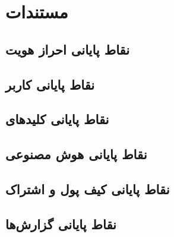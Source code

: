 \chapter{مستندات }
\label{app:api}

\section{نقاط پایانی احراز هویت}
\section{نقاط پایانی کاربر}
\section{نقاط پایانی کلیدهای }
\section{نقاط پایانی هوش مصنوعی}
\section{نقاط پایانی کیف پول و اشتراک}
\section{نقاط پایانی گزارش‌ها}
